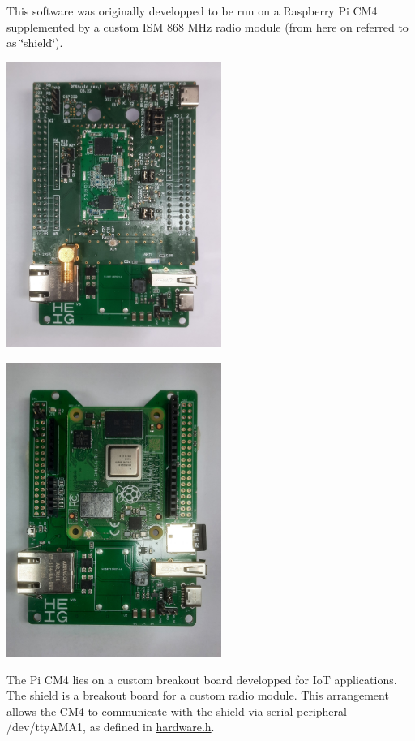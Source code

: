 This software was originally developped to be run on a Raspberry Pi CM4 supplemented by a custom ISM 868 MHz radio module (from here on referred to as \char`\"{}shield\char`\"{}).

 
\begin{DoxyImage}
\includegraphics[width=7cm]{assembly_cm4.jpg}
\end{DoxyImage}


 
\begin{DoxyImage}
\includegraphics[width=7cm]{cm4.jpg}
\end{DoxyImage}


The Pi CM4 lies on a custom breakout board developped for IoT applications. The shield is a breakout board for a custom radio module. This arrangement allows the CM4 to communicate with the shield via serial peripheral /dev/tty\+AMA1, as defined in \mbox{\hyperlink{hardware_8h}{hardware.\+h}}. 